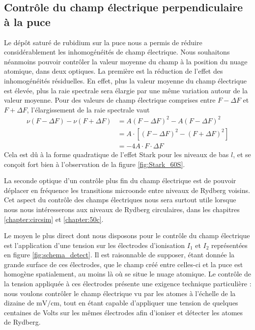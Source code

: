 	\subsection{Contrôle du champ électrique perpendiculaire à la puce}\label{subsec:compensation}
\noindent Le dépôt saturé de rubidium sur la puce nous a permis de réduire considérablement les inhomogénéités de champ électrique.
Nous souhaitons néanmoins pouvoir contrôler la valeur moyenne du champ à la position du nuage atomique, dans deux optiques.
La première est la réduction de l'effet des inhomogénéités résiduelles.
En effet, plus la valeur moyenne du champ électrique est élevée, plus la raie spectrale sera élargie par une même variation autour de la valeur moyenne.
Pour des valeurs de champ électrique comprises entre $F-\Delta F$ et $F + \Delta F$, l'élargissement de la raie spectrale vaut
%
\begin{equation}
\label{eq:Stark_broadening}
\begin{aligned}
\nu(F-\Delta F) - \nu(F+\Delta F) &= A (F-\Delta F)^2 - A (F-\Delta F)^2 \\
&= A\cdot [(F-\Delta F)^2 - (F+\Delta F)^2] \\
&= -4A \cdot F\cdot \Delta F
\end{aligned}
\end{equation}
Cela est dû à la forme quadratique de l'effet Stark pour les niveaux de bas $l$, et se conçoit fort bien à l'observation de la figure \eqref{fig:Stark_60S}.

La seconde optique d'un contrôle plus fin du champ électrique est de pouvoir déplacer en fréquence %
les transitions microonde entre niveaux de Rydberg voisins.
Cet aspect du contrôle des champs électriques nous sera surtout utile lorsque nous nous intéresserons aux niveaux de Rydberg circulaires, dans les chapitres \ref{chapter:circsim} et \ref{chapter:50c}.
	
Le moyen le plus direct dont nous disposons pour le contrôle du champ électrique est l'application d'une tension sur les électrodes d'ionisation $I_1$ et $I_2$ représentées en figure \eqref{fig:schema_detect}.
Il est raisonnable de supposer, étant donnée la grande surface de ces électrodes, que le champ créé entre celles-ci et la puce est homogène spatialement, au moins là où se situe le nuage atomique.
Le contrôle de la tension appliquée à ces électrodes présente une exigence technique particulière :
nous voulons contrôler le champ électrique vu par les atomes à l'échelle de la dizaine de $\si{\mV/\cm}$, tout en étant capable d'appliquer une tension de quelques centaines de Volts sur les mêmes électrodes afin d'ioniser et détecter les atomes de Rydberg.

